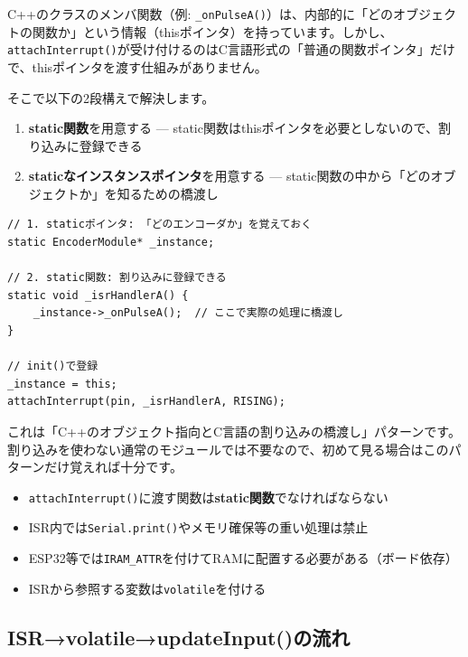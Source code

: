\begin{notebox}
C++のクラスのメンバ関数（例: \texttt{\_onPulseA()}）は、内部的に「どのオブジェクトの関数か」という情報（thisポインタ）を持っています。しかし、\texttt{attachInterrupt()}が受け付けるのはC言語形式の「普通の関数ポインタ」だけで、thisポインタを渡す仕組みがありません。

そこで以下の2段構えで解決します。

\begin{enumerate}
    \item \textbf{static関数}を用意する — static関数はthisポインタを必要としないので、割り込みに登録できる
    \item \textbf{staticなインスタンスポインタ}を用意する — static関数の中から「どのオブジェクトか」を知るための橋渡し
\end{enumerate}

\begin{lstlisting}
// 1. staticポインタ: 「どのエンコーダか」を覚えておく
static EncoderModule* _instance;

// 2. static関数: 割り込みに登録できる
static void _isrHandlerA() {
    _instance->_onPulseA();  // ここで実際の処理に橋渡し
}

// init()で登録
_instance = this;
attachInterrupt(pin, _isrHandlerA, RISING);
\end{lstlisting}

これは「C++のオブジェクト指向とC言語の割り込みの橋渡し」パターンです。割り込みを使わない通常のモジュールでは不要なので、初めて見る場合はこのパターンだけ覚えれば十分です。
\end{notebox}

\begin{cautionbox}
\begin{itemize}
    \item \texttt{attachInterrupt()}に渡す関数は\textbf{static関数}でなければならない
    \item ISR内では\texttt{Serial.print()}やメモリ確保等の重い処理は禁止
    \item ESP32等では\texttt{IRAM\_ATTR}を付けてRAMに配置する必要がある（ボード依存）
    \item ISRから参照する変数は\texttt{volatile}を付ける
\end{itemize}
\end{cautionbox}

\subsection{ISR→volatile→updateInput()の流れ}

